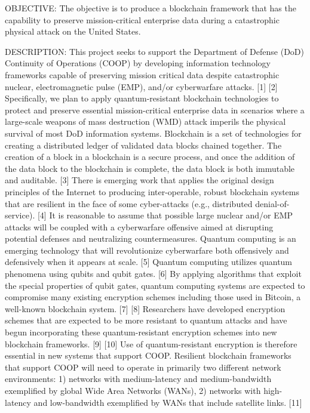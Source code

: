 
OBJECTIVE: The objective is to produce a blockchain framework that has the capability to preserve mission-critical enterprise data during a catastrophic physical attack on the United States.

DESCRIPTION: This project seeks to support the Department of Defense (DoD) Continuity of Operations (COOP) by developing information technology frameworks capable of preserving mission critical data despite catastrophic nuclear, electromagnetic pulse (EMP), and/or cyberwarfare attacks. [1] [2] Specifically, we plan to apply quantum-resistant blockchain technologies to protect and preserve essential mission-critical enterprise data in scenarios where a large-scale weapons of mass destruction (WMD) attack imperils the physical survival of most DoD information systems. 
Blockchain is a set of technologies for creating a distributed ledger of validated data blocks chained together. The creation of a block in a blockchain is a secure process, and once the addition of the data block to the blockchain is complete, the data block is both immutable and auditable. [3] There is emerging work that applies the original design principles of the Internet to producing inter-operable, robust blockchain systems that are resilient in the face of some cyber-attacks (e.g., distributed denial-of-service). [4] 
It is reasonable to assume that possible large nuclear and/or EMP attacks will be coupled with a cyberwarfare offensive aimed at disrupting potential defenses and neutralizing countermeasures. Quantum computing is an emerging technology that will revolutionize cyberwarfare both offensively and defensively when it appears at scale. [5] Quantum computing utilizes quantum phenomena using qubits and qubit gates. [6] By applying algorithms that exploit the special properties of qubit gates, quantum computing systems are expected to compromise many existing encryption schemes including those used in Bitcoin, a well-known blockchain system. [7] [8] Researchers have developed encryption schemes that are expected to be more resistant to quantum attacks and have begun incorporating these quantum-resistant encryption schemes into new blockchain frameworks. [9] [10] Use of quantum-resistant encryption is therefore essential in new systems that support COOP. 
Resilient blockchain frameworks that support COOP will need to operate in primarily two different network environments: 1) networks with medium-latency and medium-bandwidth exemplified by global Wide Area Networks (WANs), 2) networks with high-latency and low-bandwidth exemplified by WANs that include satellite links. [11]

